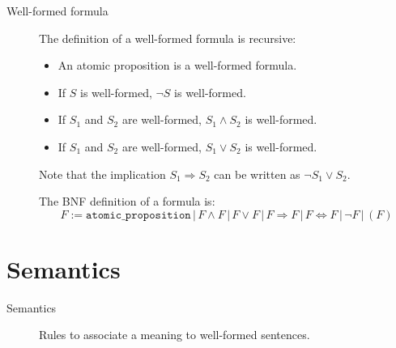 \begin{description}
    \item[Well-formed formula] 
        The definition of a well-formed formula is recursive:
        \begin{itemize}
            \item An atomic proposition is a well-formed formula.
            \item If $S$ is well-formed, $\lnot S$ is well-formed.
            \item If $S_1$ and $S_2$ are well-formed, $S_1 \land S_2$ is well-formed.
            \item If $S_1$ and $S_2$ are well-formed, $S_1 \vee S_2$ is well-formed.
        \end{itemize}

        Note that the implication $S_1 \Rightarrow S_2$ can be written as $\lnot S_1 \vee S_2$.

        The BNF definition of a formula is:
        \[
            F := \texttt{atomic\_proposition} \,|\, F \land F \,|\, F \vee F \,|\,  
                F \Rightarrow F \,|\, F \Leftrightarrow F \,|\, \lnot F \,|\, (F) 
        \]
\end{description}


\section{Semantics}

\begin{description}
    \item[Semantics] 
        Rules to associate a meaning to well-formed sentences.
\end{description}

